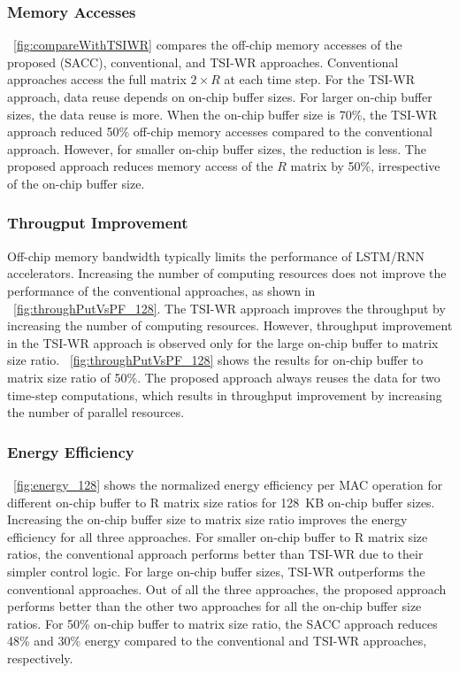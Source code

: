 \documentclass[a4paper,10pt]{article}
\begin{document}
\subsubsection{Memory Accesses}
\figurename{~\ref{fig:compareWithTSIWR}} compares the off-chip memory accesses of the proposed (SACC), conventional, and TSI-WR approaches. Conventional approaches access the full matrix $2{\times}R$ at each time step. For the TSI-WR approach, data reuse depends on on-chip buffer sizes. For larger on-chip buffer sizes, the data reuse is more. When the on-chip buffer size is 70\%, the TSI-WR approach reduced 50\% off-chip memory accesses compared to the conventional approach. However, for smaller on-chip buffer sizes, the reduction is less. The proposed approach reduces memory access of the $R$ matrix by 50\%, irrespective of the on-chip buffer size.
\subsubsection{Througput Improvement}
Off-chip memory bandwidth typically limits the performance of LSTM/RNN accelerators. Increasing the number of computing resources does not improve the performance of the conventional approaches, as shown in \figurename{~\ref{fig:throughPutVsPF_128}}. The TSI-WR approach improves the throughput by increasing the number of computing resources. However, throughput improvement in the TSI-WR approach is observed only for the large on-chip buffer to matrix size ratio. \figurename{~\ref{fig:throughPutVsPF_128}} shows the results for on-chip buffer to matrix size ratio of 50\%. The proposed approach always reuses the data for two time-step computations, which results in throughput improvement by increasing the number of parallel resources.
\subsubsection{Energy Efficiency}
\figurename{~\ref{fig:energy_128}} shows the normalized energy efficiency per MAC operation for different on-chip buffer to R matrix size ratios for 128~KB on-chip buffer sizes. Increasing the on-chip buffer size to matrix size ratio improves the energy efficiency for all three approaches. For smaller on-chip buffer to R matrix size ratios, the conventional approach performs better than TSI-WR due to their simpler control logic. For large on-chip buffer sizes, TSI-WR outperforms the conventional approaches. Out of all the three approaches, the proposed approach performs better than the other two approaches for all the on-chip buffer size ratios. For 50\% on-chip buffer to matrix size ratio, the SACC approach reduces 48\% and 30\% energy compared to the conventional and TSI-WR approaches, respectively.
\end{document}
